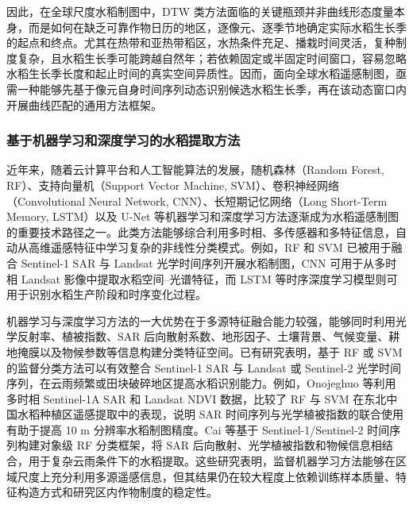 因此，在全球尺度水稻制图中，DTW 类方法面临的关键瓶颈并非曲线形态度量本身，而是如何在缺乏可靠作物日历的地区，逐像元、逐季节地确定实际水稻生长季的起点和终点。尤其在热带和亚热带稻区，水热条件充足、播栽时间灵活，复种制度复杂，且水稻生长季可能跨越自然年；若依赖固定或半固定时间窗口，容易忽略水稻生长季长度和起止时间的真实空间异质性。因而，面向全球水稻遥感制图，亟需一种能够先基于像元自身时间序列动态识别候选水稻生长季，再在该动态窗口内开展曲线匹配的通用方法框架。

\subsubsection{基于机器学习和深度学习的水稻提取方法}


近年来，随着云计算平台和人工智能算法的发展，随机森林（Random Forest, RF）、支持向量机（Support Vector Machine, SVM）、卷积神经网络（Convolutional Neural Network, CNN）、长短期记忆网络（Long Short-Term Memory, LSTM）以及 U-Net 等机器学习和深度学习方法逐渐成为水稻遥感制图的重要技术路径之一。此类方法能够综合利用多时相、多传感器和多特征信息，自动从高维遥感特征中学习复杂的非线性分类模式。例如，RF 和 SVM 已被用于融合 Sentinel-1 SAR 与 Landsat 光学时间序列开展水稻制图\cite{Onojeghuo2018ML}，CNN 可用于从多时相 Landsat 影像中提取水稻空间--光谱特征\cite{Zhang2018CNN}，而 LSTM 等时序深度学习模型则可用于识别水稻生产阶段和时序变化过程\cite{Thorp2021RSE}。

机器学习与深度学习方法的一大优势在于多源特征融合能力较强，能够同时利用光学反射率、植被指数、SAR 后向散射系数、地形因子、土壤背景、气候变量、耕地掩膜以及物候参数等信息构建分类特征空间。已有研究表明，基于 RF 或 SVM 的监督分类方法可以有效整合 Sentinel-1 SAR 与 Landsat 或 Sentinel-2 光学时间序列，在云雨频繁或田块破碎地区提高水稻识别能力。例如，Onojeghuo 等利用多时相 Sentinel-1A SAR 和 Landsat NDVI 数据，比较了 RF 与 SVM 在东北中国水稻种植区遥感提取中的表现，说明 SAR 时间序列与光学植被指数的联合使用有助于提高 10 m 分辨率水稻制图精度\cite{Onojeghuo2018ML}。Cai 等基于 Sentinel-1/Sentinel-2 时间序列构建对象级 RF 分类框架，将 SAR 后向散射、光学植被指数和物候信息相结合，用于复杂云雨条件下的水稻提取\cite{Cai2019ASR}。这些研究表明，监督机器学习方法能够在区域尺度上充分利用多源遥感信息，但其结果仍在较大程度上依赖训练样本质量、特征构造方式和研究区内作物制度的稳定性。

